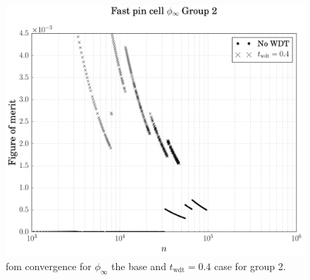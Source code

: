 \begin{figure}[hbtp]
  \centering
  \includegraphics[scale=0.5]{images/results/fast_inf_flx_example}
  \caption[\Acrshort{fom} convergence for $\phi_{\infty}$ for the base
  and $t_{\mathrm{wdt}} = 0.4$ case for group 2.]{\Acrshort{fom} convergence for
    $\phi_{\infty}$ the base and $t_{\mathrm{wdt}} = 0.4$ case for
    group 2.}
  \label{fig:fast_inf_flx_example}
\end{figure}


